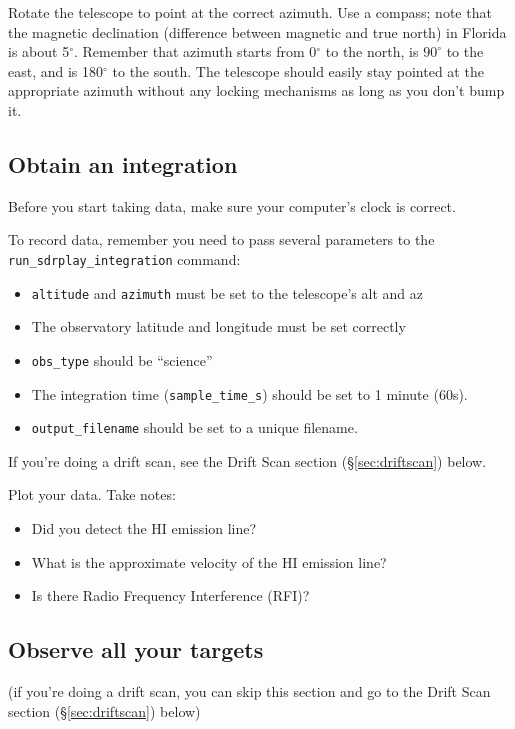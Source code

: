 \documentclass[11pt]{article}
\begin{document}
Rotate the telescope to point at the correct azimuth.
Use a compass; note that the magnetic declination (difference between magnetic
and true north) in Florida is about 5$^\circ$.
Remember that azimuth starts from 0$^\circ$ to the north, is $90^\circ$ to the east,
and is 180$^\circ$ to the south.
The telescope should easily stay pointed at the appropriate azimuth without
any locking mechanisms as long as you don't bump it.


\subsection{Obtain an integration}
\label{sec:integrate}
Before you start taking data, make sure your computer's clock is correct.


To record data, remember you need to pass several parameters to the \verb|run_sdrplay_integration| command:
\begin{itemize}
    \item \verb|altitude| and \verb|azimuth| must be set to the telescope's alt and az
    \item The observatory latitude and longitude must be set correctly
    \item \verb|obs_type| should be ``science''
    \item The integration time (\verb|sample_time_s|) should be set to 1 minute (60s).
    \item \verb|output_filename| should be set to a unique filename.
\end{itemize}

If you're doing a drift scan, see the Drift Scan section (\S \ref{sec:driftscan}) below.

Plot your data.  Take notes:
\begin{itemize}
    \item Did you detect the HI emission line?
    \item What is the approximate velocity of the HI emission line?
    \item Is there Radio Frequency Interference (RFI)?
\end{itemize}

\subsection{Observe all your targets}

(if you're doing a drift scan, you can skip this section and go to the Drift Scan section (\S \ref{sec:driftscan}) below)
\end{document}
